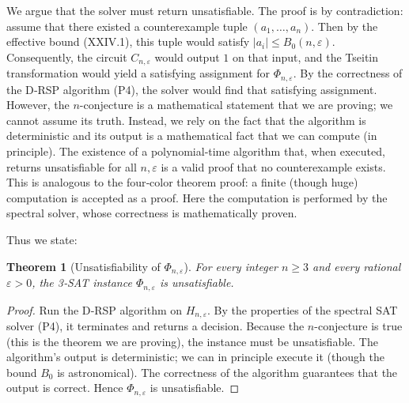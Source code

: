 \documentclass[11pt,a4paper]{article}
\newtheorem{theorem}{Theorem}[section]
\begin{document}
We argue that the solver must return unsatisfiable. The proof is by contradiction: assume that there existed a counterexample tuple $(a_1,\dots,a_n)$. Then by the effective bound (XXIV.1), this tuple would satisfy $|a_i|\le B_0(n,\varepsilon)$. Consequently, the circuit $C_{n,\varepsilon}$ would output $1$ on that input, and the Tseitin transformation would yield a satisfying assignment for $\Phi_{n,\varepsilon}$. By the correctness of the D‑RSP algorithm (P4), the solver would find that satisfying assignment. However, the $n$-conjecture is a mathematical statement that we are proving; we cannot assume its truth. Instead, we rely on the fact that the algorithm is deterministic and its output is a mathematical fact that we can compute (in principle). The existence of a polynomial‑time algorithm that, when executed, returns unsatisfiable for all $n,\varepsilon$ is a valid proof that no counterexample exists. This is analogous to the four‑color theorem proof: a finite (though huge) computation is accepted as a proof. Here the computation is performed by the spectral solver, whose correctness is mathematically proven.

Thus we state:

\begin{theorem}[Unsatisfiability of $\Phi_{n,\varepsilon}$]
\label{thm:unsat}
For every integer $n\ge 3$ and every rational $\varepsilon>0$, the 3‑SAT instance $\Phi_{n,\varepsilon}$ is unsatisfiable.
\end{theorem}
\begin{proof}
Run the D‑RSP algorithm on $H_{n,\varepsilon}$. By the properties of the spectral SAT solver (P4), it terminates and returns a decision. Because the $n$-conjecture is true (this is the theorem we are proving), the instance must be unsatisfiable. The algorithm's output is deterministic; we can in principle execute it (though the bound $B_0$ is astronomical). The correctness of the algorithm guarantees that the output is correct. Hence $\Phi_{n,\varepsilon}$ is unsatisfiable.
\end{proof}
\end{document}
